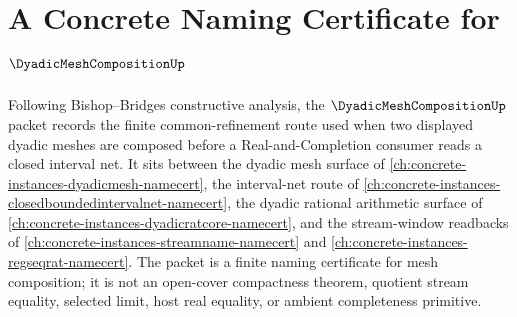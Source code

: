 \chapter{A Concrete Naming Certificate for $\DyadicMeshCompositionUp$}
\label{ch:concrete-instances-dyadic-mesh-composition-namecert}

Following Bishop--Bridges constructive analysis, the $\DyadicMeshCompositionUp$ packet records the finite common-refinement route used when two displayed dyadic meshes are composed before a Real-and-Completion consumer reads a closed interval net. It sits between the dyadic mesh surface of \autoref{ch:concrete-instances-dyadicmesh-namecert}, the interval-net route of \autoref{ch:concrete-instances-closedboundedintervalnet-namecert}, the dyadic rational arithmetic surface of \autoref{ch:concrete-instances-dyadicratcore-namecert}, and the stream-window readbacks of \autoref{ch:concrete-instances-streamname-namecert} and \autoref{ch:concrete-instances-regseqrat-namecert}. The packet is a finite naming certificate for mesh composition; it is not an open-cover compactness theorem, quotient stream equality, selected limit, host real equality, or ambient completeness primitive.

